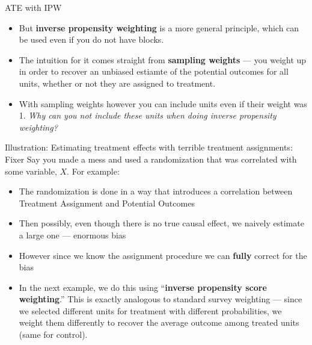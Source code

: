 \documentclass[
  11pt,
  ignorenonframetext,
]{beamer}
\providecommand{\tightlist}{%
  \setlength{\itemsep}{0pt}\setlength{\parskip}{0pt}}\usepackage{longtable,booktabs,array}
\begin{document}
\begin{frame}{ATE with IPW}
\protect\hypertarget{ate-with-ipw-1}{}
\begin{itemize}
\item
  But \textbf{inverse propensity weighting} is a more general principle,
  which can be used even if you do not have blocks.
\item
  The intuition for it comes straight from \textbf{sampling weights} ---
  you weight up in order to recover an unbiased estiamte of the
  potential outcomes for all units, whether or not they are assigned to
  treatment.
\item
  With sampling weights however you can include units even if their
  weight was 1. \emph{Why can you not include these units when doing
  inverse propensity weighting?}
\end{itemize}
\end{frame}

\begin{frame}{Illustration: Estimating treatment effects with terrible
treatment assignments: Fixer\label{Fixer}}
\protect\hypertarget{illustration-estimating-treatment-effects-with-terrible-treatment-assignments-fixer}{}
Say you made a mess and used a randomization that was correlated with
some variable, \(X\). For example:

\begin{itemize}
\tightlist
\item
  The randomization is done in a way that introduces a correlation
  between Treatment Assignment and Potential Outcomes
\item
  Then possibly, even though there is no true causal effect, we naively
  estimate a large one --- enormous bias
\item
  However since we know the assignment procedure we can \textbf{fully}
  correct for the bias
\item
  In the next example, we do this using ``\textbf{inverse propensity
  score weighting}.'' This is exactly analogous to standard survey
  weighting --- since we selected different units for treatment with
  different probabilities, we weight them differently to recover the
  average outcome among treated units (same for control).
\end{itemize}
\end{frame}
\end{document}
